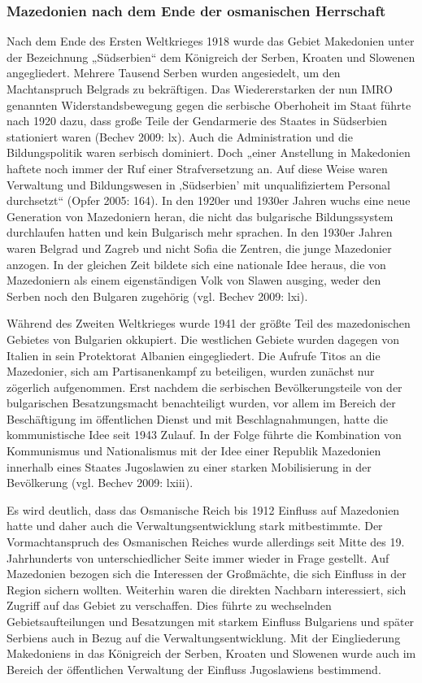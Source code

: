 \subsubsection{Mazedonien nach dem Ende der osmanischen Herrschaft }

Nach dem Ende des Ersten Weltkrieges 1918 wurde das Gebiet Makedonien unter der Bezeichnung „Südserbien“ dem Königreich der Serben, Kroaten und Slowenen angegliedert. Mehrere Tausend Serben wurden angesiedelt, um den Machtanspruch Belgrads zu bekräftigen. Das Wiedererstarken der nun IMRO genannten Widerstandsbewegung gegen die serbische Oberhoheit im Staat führte nach 1920 dazu, dass große Teile der Gendarmerie des Staates in Südserbien stationiert waren (Bechev 2009: lx). Auch die Administration und die Bildungspolitik waren serbisch dominiert. Doch „einer Anstellung in Makedonien haftete noch immer der Ruf einer Strafversetzung an. Auf diese Weise waren Verwaltung und Bildungswesen in ‚Südserbien’ mit unqualifiziertem Personal durchsetzt“ (Opfer 2005: 164). In den 1920er und 1930er Jahren wuchs eine neue Generation von Mazedoniern heran, die nicht das bulgarische Bildungssystem durchlaufen hatten und kein Bulgarisch mehr sprachen. In den 1930er Jahren waren Belgrad und Zagreb und nicht Sofia die Zentren, die junge Mazedonier anzogen. In der gleichen Zeit bildete sich eine nationale Idee heraus, die von Mazedoniern als einem eigenständigen Volk von Slawen ausging, weder den Serben noch den Bulgaren zugehörig (vgl. Bechev 2009: lxi).\par
Während des Zweiten Weltkrieges wurde 1941 der größte Teil des mazedonischen Gebietes von Bulgarien okkupiert. Die westlichen Gebiete wurden dagegen von Italien in sein Protektorat Albanien eingegliedert. Die Aufrufe Titos an die Mazedonier, sich am Partisanenkampf zu beteiligen, wurden zunächst nur zögerlich aufgenommen. Erst nachdem die serbischen Bevölkerungsteile von der bulgarischen Besatzungsmacht benachteiligt wurden, vor allem im Bereich der Beschäftigung im öffentlichen Dienst und mit Beschlagnahmungen, hatte die kommunistische Idee seit 1943 Zulauf. In der Folge führte die Kombination von Kommunismus und Nationalismus mit der Idee einer Republik Mazedonien innerhalb eines Staates Jugoslawien zu einer starken Mobilisierung in der Bevölkerung (vgl. Bechev 2009: lxiii).\par
Es wird deutlich, dass das Osmanische Reich bis 1912 Einfluss auf Mazedonien hatte und daher auch die Verwaltungsentwicklung stark mitbestimmte. Der Vormachtanspruch des Osmanischen Reiches wurde allerdings seit Mitte des 19. Jahrhunderts von unterschiedlicher Seite immer wieder in Frage gestellt. Auf Mazedonien bezogen sich die Interessen der Großmächte, die sich Einfluss in der Region sichern wollten. Weiterhin waren die direkten Nachbarn interessiert, sich Zugriff auf das Gebiet zu verschaffen. Dies führte zu wechselnden Gebietsaufteilungen und Besatzungen mit starkem Einfluss Bulgariens und später Serbiens auch in Bezug auf die Verwaltungsentwicklung. Mit der Eingliederung Makedoniens in das Königreich der Serben, Kroaten und Slowenen wurde auch im Bereich der öffentlichen Verwaltung der Einfluss Jugoslawiens bestimmend.\par
